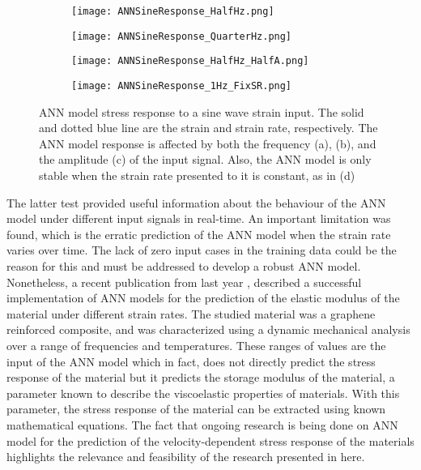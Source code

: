 \begin{figure}[htb!]
	\centering
    \begin{subfigure}[b]{0.49\textwidth}
        \centering
        \texttt{[image: ANNSineResponse\_HalfHz.png]}
        \caption{}
        \label{fig:ANNSineTesta}
    \end{subfigure}
    \begin{subfigure}[b]{0.49\textwidth}
        \centering
        \texttt{[image: ANNSineResponse\_QuarterHz.png]}
        \caption{}
        \label{fig:ANNSineTestb}
    \end{subfigure}
    \begin{subfigure}[b]{0.49\textwidth}
        \centering
        \texttt{[image: ANNSineResponse\_HalfHz\_HalfA.png]}
        \caption{}
        \label{fig:ANNSineTestc}
    \end{subfigure}
    \begin{subfigure}[b]{0.49\textwidth}
        \centering
        \texttt{[image: ANNSineResponse\_1Hz\_FixSR.png]}
        \caption{}
        \label{fig:ANNSineTestd}
    \end{subfigure}
    \caption{ANN model stress response to a sine wave strain input. The solid and dotted blue line are the strain and strain rate, respectively. The ANN model response is affected by both the frequency (a), (b), and the amplitude (c) of the input signal. Also, the ANN model is only stable when the strain rate presented to it is constant, as in (d)}
    \label{fig:ANNSineTest}
\end{figure}

The latter test provided useful information about the behaviour of the ANN model under different input signals in real-time. An important limitation was found, which is the erratic prediction of the ANN model when the strain rate varies over time. The lack of zero input cases in the training data could be the reason for this and must be addressed to develop a robust ANN model. Nonetheless, a recent publication from last year \cite{xu2019artificial} , described a successful implementation of ANN models for the prediction of the elastic modulus of the material under different strain rates. The studied material was a graphene reinforced composite, and was characterized using a dynamic mechanical analysis over a range of frequencies and temperatures. These ranges of values are the input of the ANN model which in fact, does not directly predict the stress response of the material but it predicts the storage modulus of the material, a parameter known to describe the viscoelastic properties of materials. With this parameter, the stress response of the material can be extracted using known mathematical equations. The fact that ongoing research is being done on ANN model for the prediction of the velocity-dependent stress response of the materials highlights the relevance and feasibility of the research presented in here.

